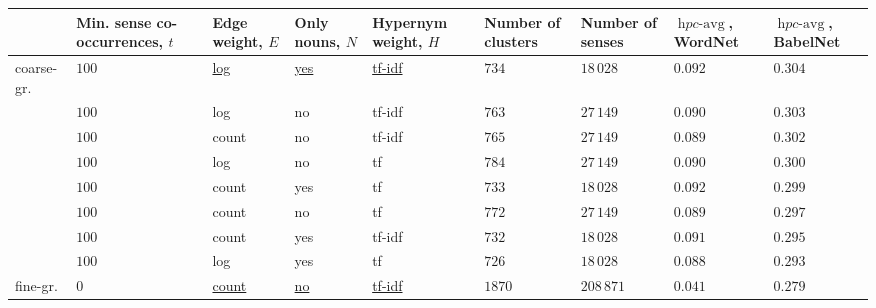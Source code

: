 \documentclass[10pt, a4paper]{article}
\DeclareMathOperator{\hpcavg}{\mathit{hpc}-avg}
\begin{document}
\begin{table}[ht]
\footnotesize
\centering
\begin{tabular}{p{1.25cm}|p{1.96cm}|p{1.4cm}|p{1.4cm}|p{1.6cm}|p{1.4cm}|p{1.4cm}|p{1.4cm}|p{1.4cm}}
 & \textbf{Min. sense co-occurrences}, $t$ & \textbf{Edge weight}, $E$ & \textbf{Only nouns}, $N$ & \textbf{Hypernym weight}, $H$ & \textbf{Number of clusters} & \textbf{Number of senses} & $\hpcavg$, \textbf{WordNet} & $\hpcavg$, \textbf{BabelNet} \\ \toprule

coarse-gr. & \underline{$100$} & \underline{log}   & \underline{yes} & \underline{tf-idf} & \underline{$734$}  &  \underline{$18\,028$} & 
\underline{$\mathbf{0.092}$} & \underline{$\mathbf{0.304}$} \\

 & $100$ & log   & no  & tf-idf & $763$  &  $27\,149$ & $0.090$ & $0.303$ \\
 & $100$ & count & no  & tf-idf & $765$  &  $27\,149$ & $0.089$ & $0.302$ \\
 & $100$ & log   & no  & tf     & $784$  &  $27\,149$ & $0.090$ & $0.300$ \\
 & $100$ & count & yes & tf     & $733$  &  $18\,028$ & $\mathbf{0.092}$ & $0.299$ \\
 & $100$ & count & no  & tf     & $772$  &  $27\,149$ & $0.089$ & $0.297$ \\
 & $100$ & count & yes & tf-idf & $732$  &  $18\,028$ & $0.091$ & $0.295$ \\
 & $100$ & log   & yes & tf     & $726$  &  $18\,028$ & $0.088$ & $0.293$ \\ \midrule

fine-gr. & \underline{$0$}   & \underline{count} & \underline{no}  & \underline{tf-idf} & \underline{$1870$} & \underline{$208\,871$} & \underline{$\mathbf{0.041}$} &  \underline{$\mathbf{0.279}$} \\


\end{tabular}
\end{table}
\end{document}
